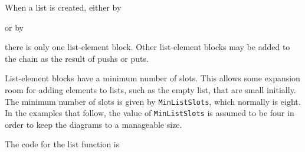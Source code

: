 When a list is created, either by


\noindent or by

\iconline{
\>[x1 ,x2, ..., xn]
}

\noindent there is only one list-element block. Other list-element
blocks may be added to the chain as the result of pushs or puts.

List-element blocks have a minimum number of slots. This allows some
expansion room for adding elements to lists, such as the empty list, that
are small initially. The minimum number of slots is given by
\texttt{MinListSlots}, which normally is eight. In the examples that
follow, the value of \texttt{MinListSlots} is assumed to be four in order
to keep the diagrams to a manageable size.

The code for the list function is

